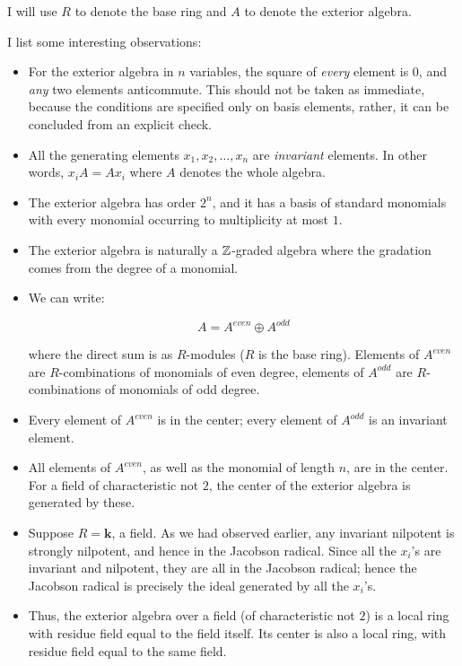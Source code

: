 \documentclass[a4paper]{amsart}
\newcommand{\field}{\mathbf{k}}
\begin{document}
I will use $R$ to denote the base ring and $A$ to denote the exterior algebra.

I list some interesting observations:

\begin{itemize}

\item For the exterior algebra in $n$ variables, the square of {\em
    every} element is $0$, and {\em any} two elements
  anticommute. This should not be taken as immediate, because the
  conditions are specified only on basis elements, rather, it can be
  concluded from an explicit check.

\item All the generating elements $x_1, x_2, \ldots, x_n$ are
  {\em invariant} elements. In other words, $x_iA = Ax_i$ where $A$ denotes
  the whole algebra.

\item The exterior algebra has order $2^n$, and it has a basis of
  standard monomials with every monomial occurring to multiplicity at most $1$.

\item The exterior algebra is naturally a $\mathbb{Z}$-graded algebra where the
  gradation comes from the degree of a monomial. 

\item We can write:

  $$A = A^{even} \oplus A^{odd}$$

  where the direct sum is as $R$-modules ($R$ is the base
  ring). Elements of $A^{even}$ are $R$-combinations of monomials of
  even degree, elements of $A^{odd}$ are $R$-combinations of monomials
  of odd degree.

\item Every element of $A^{even}$ is in the center; every element of
  $A^{odd}$ is an invariant element.

\item All elements of $A^{even}$, as well as the monomial of length
  $n$, are in the center. For a field of characteristic not $2$, the
  center of the exterior algebra is generated by these.

\item Suppose $R = \field$, a field. As we had observed earlier, any
  invariant nilpotent is strongly nilpotent, and hence in the Jacobson
  radical. Since all the $x_i$'s are invariant and nilpotent, they are
  all in the Jacobson radical; hence the Jacobson radical is precisely
  the ideal generated by all the $x_i$'s.

\item Thus, the exterior algebra over a field (of characteristic not
  $2$) is a local ring with residue field equal to the field
  itself. Its center is also a local ring, with residue field equal to
  the same field.
  
\end{itemize}
\end{document}
